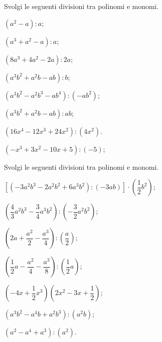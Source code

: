 \begin{esercizio}
\label{ese:10.18}
 Svolgi le seguenti divisioni tra polinomi e monomi.
 \begin{multicols}{2}
\begin{enumeratea}
 \item $\left(a^{2}-a\right):a$;
 \item $\left(a^{3}+a^{2}-a\right):a$;
 \item $\left(8a^{3}+4a^{2}-2a\right):2a$;
 \item $\left(a^{3}b^{2}+a^{2}b-ab\right):b$;
 \item $\left(a^{3}b^{2}-a^{2}b^{3}-ab^{4}\right):(-{ab}^{2})$;
 \item $\left(a^{3}b^{2}+a^{2}b-ab\right):ab$;
 \item $\left(16x^{4}-12x^{3}+24x^{2}\right):\left(4x^{2}\right)$.
 \item $\left(-x^{3}+3x^{2}-10x+5\right):(-5)$;
\end{enumeratea}
\end{multicols}
\end{esercizio}

\begin{esercizio}
\label{ese:10.19}
 Svolgi le seguenti divisioni tra polinomi e monomi.

\begin{enumeratea}
 \item $\left[\left(-3a^{2}b^{3}-2a^{2}b^{2}+6a^{3}b^{2}\right):(-3{ab})\right]\cdot\left(\dfrac{1}{2}b^{2}\right)$;
 \item $\left(\dfrac{4}{3}a^{2}b^{3}-\dfrac{3}{4}a^{3}b^{2}\right):\left(-{\dfrac{3}{2}a^{2}b^{2}}\right)$;
 \item $\left(2a+\dfrac{a^{2}}{2}-\dfrac{a^{3}}{4}\right):\left(\dfrac{a}{2}\right)$;
 \item $\left(\dfrac{1}{2}a-\dfrac{a^{2}}{4}-\dfrac{a^{3}}{8}\right):\left(\dfrac{1}{2}a\right)$;
 \item $\left(-4x+\dfrac{1}{2}x^{3}\right)\left(2x^{2}-3x+\dfrac{1}{2}\right)$;
 \item $\left(a^{3}b^{2}-a^{4}b+a^{2}b^{3}\right):\left(a^{2}b\right)$;
 \item $\left(a^{2}-a^{4}+a^{3}\right):\left(a^{2}\right)$.
\end{enumeratea}
\end{esercizio}

